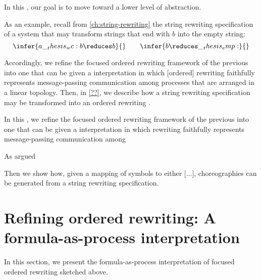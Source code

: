 In this , our goal is to move toward a lower level of abstraction.


As an example, recall from \cref{ch:string-rewriting} the string rewriting specification of a system that may transform strings that end with $b$ into the empty string:
\begin{equation}
  \infer{a \wc b \reduces b}{}
  \qquad
  \infer{b \reduces \emp}{}
\end{equation}


Accordingly, we refine the focused ordered rewriting framework of the previous  into one that can be given a  interpretation in which [ordered] rewriting faithfully represents message-passing communication among processes that are arranged in a linear topology.
Then, in \cref{??}, we describe how a string rewriting specification may be transformed into an ordered rewriting .

In this , we refine the focused ordered rewriting framework of the previous  into one that can be given a  interpretation in which rewriting faithfully represents message-passing communication among 

As argued 

Then we show how, given a mapping of symbols to either [...], choreographies can be generated from a string rewriting specification.



\section{Refining ordered rewriting: A formula-as-process interpretation}

In this section, we present the formula-as-process interpretation of focused ordered rewriting sketched above.

